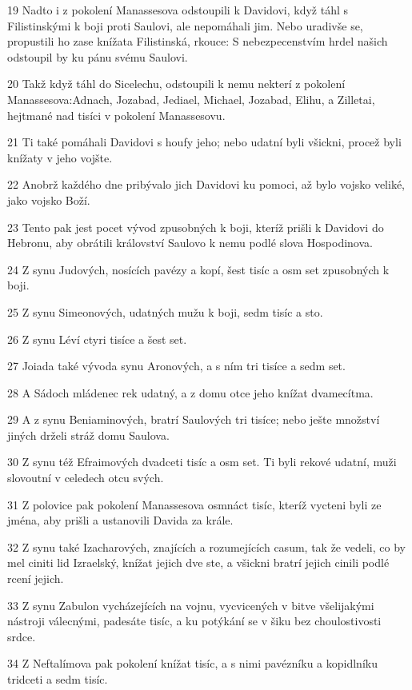 \par 19 Nadto i z pokolení Manassesova odstoupili k Davidovi, když táhl s Filistinskými k boji proti Saulovi, ale nepomáhali jim. Nebo uradivše se, propustili ho zase knížata Filistinská, rkouce: S nebezpecenstvím hrdel našich odstoupil by ku pánu svému Saulovi.
\par 20 Takž když táhl do Sicelechu, odstoupili k nemu nekterí z pokolení Manassesova:Adnach, Jozabad, Jediael, Michael, Jozabad, Elihu, a Zilletai, hejtmané nad tisíci v pokolení Manassesovu.
\par 21 Ti také pomáhali Davidovi s houfy jeho; nebo udatní byli všickni, procež byli knížaty v jeho vojšte.
\par 22 Anobrž každého dne pribývalo jich Davidovi ku pomoci, až bylo vojsko veliké, jako vojsko Boží.
\par 23 Tento pak jest pocet vývod zpusobných k boji, kteríž prišli k Davidovi do Hebronu, aby obrátili království Saulovo k nemu podlé slova Hospodinova.
\par 24 Z synu Judových, nosících pavézy a kopí, šest tisíc a osm set zpusobných k boji.
\par 25 Z synu Simeonových, udatných mužu k boji, sedm tisíc a sto.
\par 26 Z synu Léví ctyri tisíce a šest set.
\par 27 Joiada také vývoda synu Aronových, a s ním tri tisíce a sedm set.
\par 28 A Sádoch mládenec rek udatný, a z domu otce jeho knížat dvamecítma.
\par 29 A z synu Beniaminových, bratrí Saulových tri tisíce; nebo ješte množství jiných drželi stráž domu Saulova.
\par 30 Z synu též Efraimových dvadceti tisíc a osm set. Ti byli rekové udatní, muži slovoutní v celedech otcu svých.
\par 31 Z polovice pak pokolení Manassesova osmnáct tisíc, kteríž vycteni byli ze jména, aby prišli a ustanovili Davida za krále.
\par 32 Z synu také Izacharových, znajících a rozumejících casum, tak že vedeli, co by mel ciniti lid Izraelský, knížat jejich dve ste, a všickni bratrí jejich cinili podlé rcení jejich.
\par 33 Z synu Zabulon vycházejících na vojnu, vycvicených v bitve všelijakými nástroji válecnými, padesáte tisíc, a ku potýkání se v šiku bez choulostivosti srdce.
\par 34 Z Neftalímova pak pokolení knížat tisíc, a s nimi pavézníku a kopidlníku tridceti a sedm tisíc.
